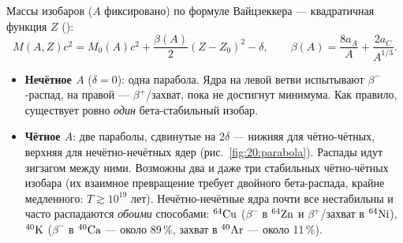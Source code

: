 Массы изобаров ($A$ фиксировано) по формуле Вайцзеккера — квадратичная функция $Z$ ():
\begin{equation}\label{eq:20:parab}
  M(A,Z)c^2=M_0(A)c^2+\frac{\beta(A)}{2}(Z-Z_0)^2-\delta,\qquad \beta(A)=\frac{8a_A}{A}+\frac{2a_C}{A^{1/3}}.
\end{equation}
\begin{itemize}
 \item \textbf{Нечётное $A$} ($\delta=0$): одна парабола. Ядра на левой ветви испытывают $\beta^-$-распад, на правой — $\beta^+$/захват,
       пока не достигнут минимума. Как правило, существует ровно \emph{один} бета-стабильный изобар.
 \item \textbf{Чётное $A$}: две параболы, сдвинутые на $2\delta$ — нижняя для чётно-чётных, верхняя для нечётно-нечётных ядер
       (рис.~\ref{fig:20:parabola}). Распады идут зигзагом между ними. Возможны два и даже три стабильных чётно-чётных изобара
       (их взаимное превращение требует двойного бета-распада, крайне медленного: $T\gtrsim10^{19}$ лет). Нечётно-нечётные ядра
       почти все нестабильны и часто распадаются \emph{обоими} способами: $\nucl{Cu}{64}$ ($\beta^-$ в $\nucl{Zn}{64}$ и $\beta^+$/захват в $\nucl{Ni}{64}$),
       $\nucl{K}{40}$ ($\beta^-$ в $\nucl{Ca}{40}$ — около 89\,\%, захват в $\nucl{Ar}{40}$ — около 11\,\%).
\end{itemize}

